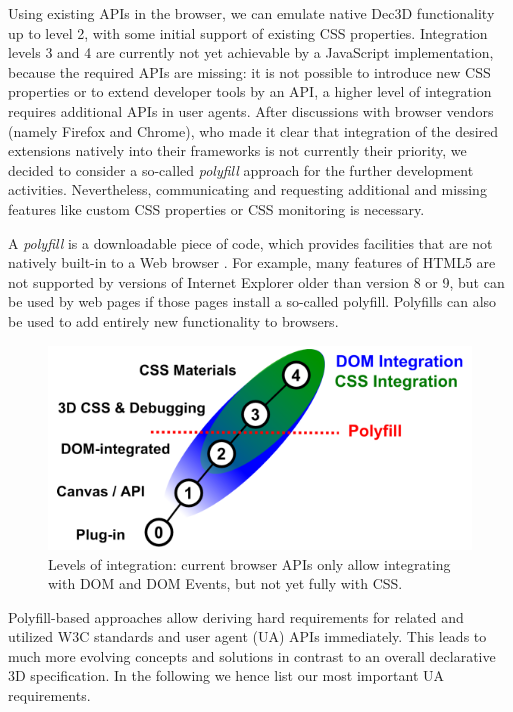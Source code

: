 \documentclass{acmsiggraph}
\begin{document}
Using existing APIs in the browser, we can emulate native Dec3D functionality up to level 2, with some initial support of existing CSS properties.
Integration levels 3 and 4 are currently not yet achievable by a JavaScript implementation, because the required APIs are missing: it is not possible to introduce new CSS properties or to extend developer tools by an API, a higher level of integration requires additional APIs in user agents. After discussions with browser vendors (namely Firefox and Chrome), who made it clear that integration of the desired extensions natively into their frameworks is not currently their priority, we decided to consider a so-called \textit{polyfill} approach for the further development activities.
Nevertheless, communicating and requesting additional and missing features like custom CSS properties or CSS monitoring is necessary.

A \textit{polyfill} is a downloadable piece of code, which provides facilities that are not natively built-in to a Web browser \cite{Sharp2010}. For example, many features of HTML5 are not supported by versions of Internet Explorer older than version 8 or 9, but can be used by web pages if those pages install a so-called polyfill. Polyfills can also be used to add entirely new functionality to browsers.

\begin{figure}
  \centering
  \includegraphics[width=0.9\columnwidth]{images/polyfill.png}
  \caption{Levels of integration: current browser APIs only allow integrating with DOM and DOM Events, but not yet fully with CSS.}
  \label{fig:polyInt}
\end{figure}

Polyfill-based approaches allow deriving hard requirements for related and utilized W3C standards and user agent (UA) APIs immediately. This leads to much more evolving concepts and solutions in contrast to an overall declarative 3D specification. In the following we hence list our most important UA requirements.
\end{document}
